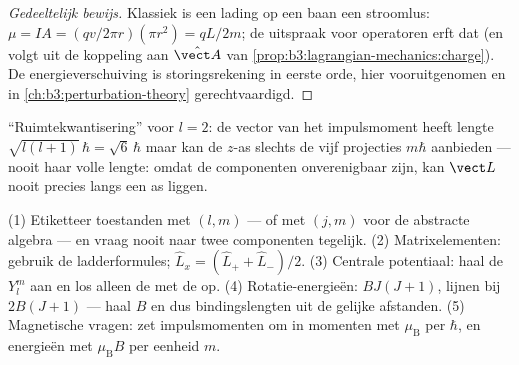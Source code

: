 \begin{proof}[Gedeeltelijk bewijs]
Klassiek is een lading op een baan een stroomlus: $\mu = IA =
(qv/2\pi r)(\pi r^2) = qL/2m$; de uitspraak voor operatoren erft dat (en
volgt uit de koppeling aan $\hat{\vect A}$ van
\cref{prop:b3:lagrangian-mechanics:charge}). De energieverschuiving is
storingsrekening in eerste orde, hier vooruitgenomen en in
\cref{ch:b3:perturbation-theory} gerechtvaardigd.
\end{proof}

\begin{omfigure}

{\small ``Ruimtekwantisering'' voor $l = 2$: de vector van het
impulsmoment heeft lengte $\sqrt{l(l+1)}\,\hbar = \sqrt6\,\hbar$ maar kan
de $z$-as slechts de vijf projecties $m\hbar$ aanbieden --- nooit haar
volle lengte: omdat de componenten onverenigbaar zijn, kan $\vect L$ nooit
precies langs een as liggen.}
\end{omfigure}

\begin{method}\label{met:b3:quantum-angular-momentum:method}
(1) Etiketteer toestanden met $(l, m)$ --- of met $(j, m)$ voor de
abstracte algebra --- en vraag nooit naar twee componenten tegelijk. (2)
Matrixelementen: gebruik de ladderformules; $\hat L_x = (\hat L_+ + \hat
L_-)/2$. (3) Centrale potentiaal: haal de $Y_l^m$ aan en los alleen de
 met de  op. (4)
Rotatie-energieën: $BJ(J+1)$, lijnen bij $2B(J+1)$ --- haal $B$ en dus
bindingslengten uit de gelijke afstanden. (5) Magnetische vragen: zet
impulsmomenten om in momenten met $\mu_{\text{B}}$ per $\hbar$, en
energieën met $\mu_{\text{B}}B$ per eenheid $m$.
\end{method}

